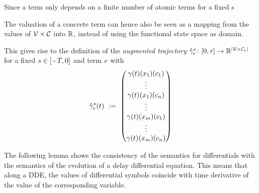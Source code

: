     \begin{definition}\label{def:aug-trajectory}
        Since a term only depends on a finite number of atomic terms for a fixed s
        
        The valuation of a concrete term can hence also be seen as a mapping from the values of $\delayvars$
        into $\R$, instead of using the functional state space as domain.

        This gives rise to the definition of the \emph{augmented trajectory} $\augtrajectory[s]{\astrm}\from\compactum{0}{r}\to\R^{\abs{\delayvars[\astrm]}}$ for a fixed $s\in\closeddelayinterval$ and term $\astrm$ with
        \begin{equation*}
            \augtrajectory[s]{\astrm}(t) \defeq \colvec{\trajectory(t)(x_1)(c_1)\\ \vdots\\ \trajectory(t)(x_1)(c_n)\\ \vdots\\ \trajectory(t)(x_m)(c_1)\\ \vdots\\ \trajectory(t)(x_m)(c_n)}
        \end{equation*}
    \end{definition}

    The following lemma shows the consistency of the semantics for differentials with the semantics of the evolution of a delay differential equation.
    This means that along a DDE, the values of differential symbols coincide with time derivative of the value of the corresponding variable.

